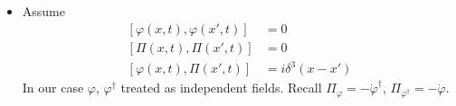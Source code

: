 \documentclass[twoside]{amsart}
\begin{document}
\begin{itemize}
\[
\begin{aligned}
  \int d^3x e^{-ik'x} \partial_0 \varphi^{\dag}(x) & = \int d^3x e^{-ik'x} \int \tilde{k} (a_k^{\dag}(i\omega) e^{-ikx} + b_k (-i\omega) e^{ikx} ) = i\int \tilde{k} \omega \int d^3 x \left( e^{-ix (k'+k) } a_k^{\dag} - e^{ix(k -k')} b_k \right) = \\
  & = \frac{i}{2} e^{2 i \omega t} a^{\dag}(-\mathbf{k}) - \frac{i}{2} b(\mathbf{k}) 
\end{aligned}
\]
Likewise,
\[
\begin{aligned}
  \int d^3 x e^{-ikx } \varphi(x) & = \frac{ a(\mathbf{k})}{2 \omega} + \frac{ b^{\dag}(-\mathbf{k}) e^{2i \omega t}}{ 2\omega} \\ 
  \int d^3 x e^{-ikx } \partial_0 \varphi(x) & = \frac{-i a(\mathbf{k})}{2} + \frac{i b^{\dag}(-\mathbf{k}) e^{2 i \omega t}}{ 2} \\ 
  \int d^3 x e^{-ikx } \varphi^{\dag}(x) & = \frac{ a^{\dag}(-\mathbf{k}) }{2 \omega}e^{2i\omega t} + \frac{ b(\mathbf{k})}{ 2\omega} \\ 
  \int d^3 x e^{-ikx } \partial_0 \varphi^{\dag}(x) & = \frac{ ia^{\dag}(-\mathbf{k})}{2 } e^{2i\omega t}+ \frac{ -i b(\mathbf{k})}{ 2} \\ 
\end{aligned} \quad \quad \, \Longrightarrow \boxed{ \begin{aligned} a(\mathbf{k}) & = \int d^3x e^{-ikx} (\omega \varphi(x) + i \partial_0 \varphi )  \\ b(\mathbf{k}) & = \int d^3x e^{-ikx} (\omega \varphi^{\dag}(x) + i \partial_0 \varphi^{\dag}(x) ) \end{aligned} }
\]
\item[(d)] Assume \\
\[
\begin{aligned}
   \left[ \varphi(x,t), \varphi(x',t) \right] & =0 \\ 
   [ \Pi(x,t), \Pi(x',t) ] & = 0 \\ 
   [\varphi(x,t), \Pi(x',t) ] & = i \delta^3(x-x')
\end{aligned}
\]
In our case $\varphi$, $\varphi^{\dag}$ treated as independent fields.  Recall $\Pi_{\varphi} = - \dot{\varphi}^{\dag}$, $\Pi_{\varphi^{\dag}} = - \dot{\varphi}$.  


\end{itemize}
\end{document}
